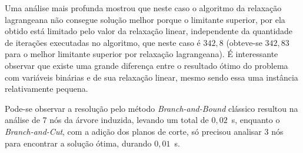 \documentclass{article}
\begin{document}
    Uma análise mais profunda mostrou que neste caso o algoritmo da relaxação lagrangeana não consegue solução melhor porque o limitante superior, por ela obtido está limitado pelo valor da relaxação linear, independente da quantidade de iterações executadas no algoritmo, que neste caso é $ 342{,}8 $ (obteve-se $ 342{,}83 $ para o melhor limitante superior por relaxação lagrangeana). É interessante observar que existe uma grande diferença entre o resultado ótimo do problema com variáveis binárias e de sua relaxação linear, mesmo sendo essa uma instância relativamente pequena. 
    
    \begin{table}[h]
	        \centering
	        \caption{Tempo de execução é calculado em segundos. Escrever aqui...}
	        \label{tab:tempos}
	    \end{table}
    
    Pode-se observar a resolução pelo método \emph{Branch-and-Bound} clássico resultou na análise de 7 nós da árvore induzida, levando um total de $0{,}02$~s, enquanto o \emph{Branch-and-Cut}, com a adição dos planos de corte, só precisou analisar 3 nós para encontrar a solução ótima, durando $0{,}01$~s. 
    
\end{document}
